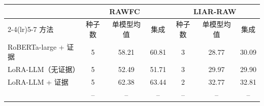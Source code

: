 \begin{tabular}{lcccccc}
\toprule
 & \multicolumn{3}{c}{RAWFC} & \multicolumn{3}{c}{LIAR-RAW} \\
\cmidrule(lr){2-4}\cmidrule(lr){5-7}
方法 & 种子数 & 单模型均值 & 集成 & 种子数 & 单模型均值 & 集成 \\
\midrule
RoBERTa-large + 证据 & 5 & 58.21 & 60.81 & 3 & 28.77 & 30.09 \\
LoRA-LLM（无证据） & 5 & 52.49 & 51.71 & 3 & 29.97 & 29.90 \\
LoRA-LLM + 证据 & 5 & 62.38 & 63.44 & 2 & 32.77 & 32.81 \\
\ours{} & -- & -- & -- & -- & -- & -- \\
\bottomrule
\end{tabular}
